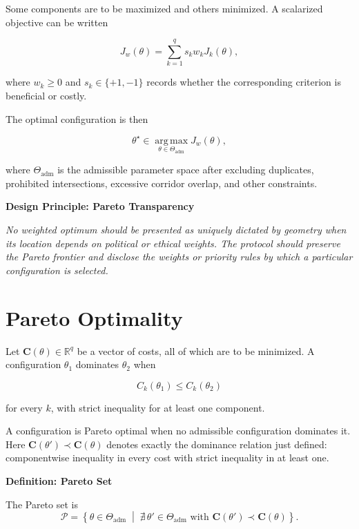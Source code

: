 \documentclass[11pt,fleqn]{book}
\numberwithin{equation}{chapter}
\newenvironment{definition}[1]
  {\begin{definitionEnv}
   \noindent\textbf{Definition: #1}\par\smallskip}
  {\end{definitionEnv}}
\newenvironment{principle}[1]
  {\begin{principleEnv}
   \noindent\textbf{Design Principle: #1}\par\smallskip\itshape}
  {\end{principleEnv}}
\theoremstyle{plain}
\theoremstyle{definition}
\theoremstyle{remark}
\newcommand{\R}{\mathbb{R}}
\newcommand{\argmax}{\operatorname*{arg\,max}}
\newcommand{\suchthat}{\;\middle|\;}
\begin{document}
Some components are to be maximized and others minimized. A scalarized objective can be written

\begin{equation}
    J_w(\theta)
    =
    \sum_{k=1}^{q}s_k w_kJ_k(\theta),
\end{equation}

where \(w_k\geq 0\) and \(s_k\in\{+1,-1\}\) records whether the corresponding criterion is beneficial or costly.

The optimal configuration is then

\begin{equation}
    \theta^\star
    \in
    \argmax_{\theta\in\Theta_{\mathrm{adm}}}
    J_w(\theta),
\end{equation}

where \(\Theta_{\mathrm{adm}}\) is the admissible parameter space after excluding duplicates, prohibited intersections, excessive corridor overlap, and other constraints.

\begin{principle}{Pareto Transparency}
No weighted optimum should be presented as uniquely dictated by geometry when its location depends on political or ethical weights. The protocol should preserve the Pareto frontier and disclose the weights or priority rules by which a particular configuration is selected.
\end{principle}

\section{Pareto Optimality}

Let \(\mathbf{C}(\theta)\in\R^q\) be a vector of costs, all of which are to be minimized. A configuration \(\theta_1\) dominates \(\theta_2\) when

\begin{equation}
    C_k(\theta_1)
    \leq
    C_k(\theta_2)
\end{equation}

for every \(k\), with strict inequality for at least one component.

A configuration is Pareto optimal when no admissible configuration dominates it. Here \(\mathbf{C}(\theta')\prec\mathbf{C}(\theta)\) denotes exactly the dominance relation just defined: componentwise inequality in every cost with strict inequality in at least one.

\begin{definition}{Pareto Set}
The Pareto set is
\[
\mathcal{P}
=
\left\{
\theta\in\Theta_{\mathrm{adm}}
\suchthat
\nexists\,
\theta'
\in\Theta_{\mathrm{adm}}
\text{ with }
\mathbf{C}(\theta')
\prec
\mathbf{C}(\theta)
\right\}.
\]
\end{definition}
\end{document}
